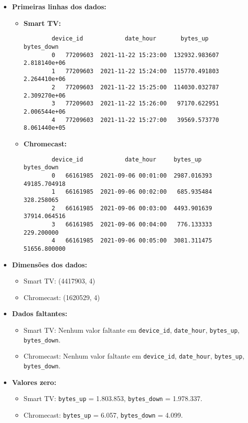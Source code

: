 \begin{itemize}
    \item \textbf{Primeiras linhas dos dados:}
    \begin{itemize}
        \item \textbf{Smart TV:}
        \begin{verbatim}
        device_id            date_hour       bytes_up    bytes_down
        0   77209603  2021-11-22 15:23:00  132932.983607  2.818140e+06
        1   77209603  2021-11-22 15:24:00  115770.491803  2.264410e+06
        2   77209603  2021-11-22 15:25:00  114030.032787  2.309270e+06
        3   77209603  2021-11-22 15:26:00   97170.622951  2.006544e+06
        4   77209603  2021-11-22 15:27:00   39569.573770  8.061440e+05
        \end{verbatim}
        
        \item \textbf{Chromecast:}
        \begin{verbatim}
        device_id            date_hour     bytes_up    bytes_down
        0   66161985  2021-09-06 00:01:00  2987.016393  49185.704918
        1   66161985  2021-09-06 00:02:00   685.935484    328.258065
        2   66161985  2021-09-06 00:03:00  4493.901639  37914.064516
        3   66161985  2021-09-06 00:04:00   776.133333    229.200000
        4   66161985  2021-09-06 00:05:00  3081.311475  51656.800000
        \end{verbatim}
    \end{itemize}
    
    \item \textbf{Dimensões dos dados:}
    \begin{itemize}
        \item Smart TV: (4417903, 4)
        \item Chromecast: (1620529, 4)
    \end{itemize}

    \item \textbf{Dados faltantes:}
    \begin{itemize}
        \item Smart TV: Nenhum valor faltante em \texttt{device\_id}, \texttt{date\_hour}, \texttt{bytes\_up}, \texttt{bytes\_down}.
        \item Chromecast: Nenhum valor faltante em \texttt{device\_id}, \texttt{date\_hour}, \texttt{bytes\_up}, \texttt{bytes\_down}.
    \end{itemize}

    \item \textbf{Valores zero:}
    \begin{itemize}
        \item Smart TV: \texttt{bytes\_up} = 1.803.853, \texttt{bytes\_down} = 1.978.337.
        \item Chromecast: \texttt{bytes\_up} = 6.057, \texttt{bytes\_down} = 4.099.
    \end{itemize}


\end{itemize}
